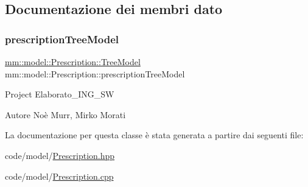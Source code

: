 \subsection{Documentazione dei membri dato}
\mbox{\label{classmm_1_1model_1_1_prescription_a5dd928aaafb51cd30d4183df7697ce49}} 
\subsubsection{\texorpdfstring{prescription\+Tree\+Model}{prescriptionTreeModel}}
{\footnotesize\ttfamily \hyperlink{structmm_1_1model_1_1_prescription_1_1_tree_model}{mm\+::model\+::\+Prescription\+::\+Tree\+Model} mm\+::model\+::\+Prescription\+::prescription\+Tree\+Model\hspace{0.3cm}{\ttfamily [static]}}

Project Elaborato\+\_\+\+I\+N\+G\+\_\+\+SW \begin{DoxyAuthor}{Autore}
Noè Murr, Mirko Morati 
\end{DoxyAuthor}


La documentazione per questa classe è stata generata a partire dai seguenti file\+:\begin{DoxyCompactItemize}
\item 
code/model/\hyperlink{_prescription_8hpp}{Prescription.\+hpp}\item 
code/model/\hyperlink{_prescription_8cpp}{Prescription.\+cpp}\end{DoxyCompactItemize}
